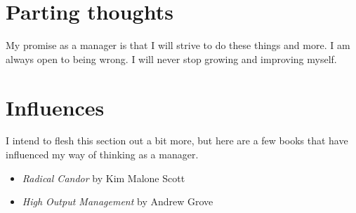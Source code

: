 \documentclass[11pt]{amsart}
\begin{document}






\section{Parting thoughts}
My promise as a manager is that I will strive to do these things and more. I am always open to being wrong. I will never stop growing and improving myself. 


\section{Influences}

I intend to flesh this section out a bit more, but here are a few books that have influenced my way of thinking as a manager.

\begin{itemize}
  \item \emph{Radical Candor} by Kim Malone Scott 
  \item \emph{High Output Management} by Andrew Grove
\end{itemize}
\end{document}
